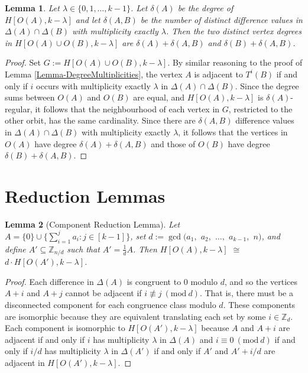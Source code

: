 \documentclass[12pt]{article}
\newcommand{\Z}{\mathbb{Z}}
\newcommand{\Mod}[1]{\ (\mathrm{mod}\ #1)}
\newtheorem{lem}{Lemma} %
\theoremstyle{definition}
\begin{document}
	\begin{lem}
		Let $\lambda \in \{0, 1, \ldots, k-1\}$.  Let $\delta(A)$ be the degree of $H[O(A),k-\lambda]$ and let $\delta(A,B)$ be the number of distinct difference values in $\Delta(A) \cap \Delta(B)$ with multiplicity exactly $\lambda$.  Then the two distinct vertex degrees in $H[O(A) \cup O(B), k-\lambda]$ are $\delta(A) + \delta(A,B)$ and $\delta(B) + \delta(A,B)$.
	\end{lem}
	\begin{proof}
		Set $G:= H[O(A) \cup O(B), k-\lambda]$.  By similar reasoning to the proof of Lemma \ref{Lemma-DegreeMultiplicities}, the vertex $A$ is adjacent to $T^i(B)$ if and only if $i$ occurs with multiplicity exactly $\lambda$ in $\Delta(A) \cap \Delta(B)$.  Since the degree sums between $O(A)$ and $O(B)$ are equal, and $H[O(A),k-\lambda]$ is $\delta(A)$-regular, it follows that the neighbourhood of each vertex in $G$, restricted to the other orbit, has the same cardinality.  Since there are $\delta(A,B)$ difference values in $\Delta(A) \cap \Delta(B)$ with multiplicity exactly $\lambda$, it follows that the vertices in $O(A)$ have degree $\delta(A) + \delta(A,B)$ and those of $O(B)$ have degree $\delta(B) + \delta(A,B)$. \qedhere
	\end{proof}
	
	
	\section{Reduction Lemmas}
	
	\begin{lem}[Component Reduction Lemma]\label{Lemma-ComponentReduction}
		Let $A = \{0\}\cup \{\sum_{i=1}^{j}a_i:j \in [k-1]\}$, set $d := \gcd(a_1,$ $a_2,$ $\ldots,$ $a_{k-1},$ $n)$, and define $A' \subseteq \Z_{n/d}$ such that $A' = \tfrac{1}{d}A$.  Then $H[O(A), k-\lambda]$ $\cong$ $d\cdot H[O(A'), k-\lambda]$.  
	\end{lem}
	\begin{proof}
		Each difference in $\Delta(A)$ is congruent to $0$ modulo $d$, and so the vertices $A+i$ and $A+j$ cannot be adjacent if $i \not\equiv j \Mod{d}$.  That is, there must be a disconnected component for each congruence class modulo $d$.  These components are isomorphic because they are equivalent translating each set by some $i \in \Z_d$.  Each component is isomorphic to $H[O(A'),k-\lambda]$ because $A$ and $A+i$ are adjacent if and only if $i$ has multiplicity $\lambda$ in $\Delta(A)$ and $i \equiv 0 \Mod{d}$ if and only if $i/d$ has multiplicity $\lambda$ in $\Delta(A')$ if and only if $A'$ and $A' + i/d$ are adjacent in $H[O(A'), k-\lambda]$. \qedhere
	\end{proof}
	
\end{document}
